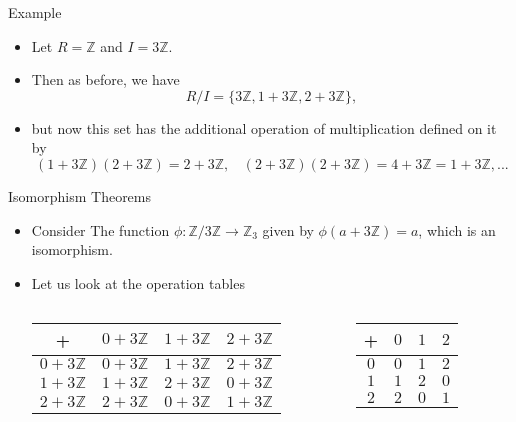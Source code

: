 \documentclass[ %
 10pt, xcolor={dvipsnames,svgnames,x11names,hyperref},
   hyperref={colorlinks=true,citecolor=green,linkcolor=DarkRed,urlcolor=ProcessBlue,anchorcolor=blue}
  ]{beamer}
\newenvironment{stepitemize}{\begin{itemize}[<+->]}{\end{itemize} }
\newcommand{\Z}{\mathbb{Z}}
\begin{document}
\begin{frame}{Example}
\begin{stepitemize}
    \item Let $R=\Z$ and $I=3\Z$. 
    \item Then as before, we have 
    $$R/I = \{3\Z, 1+3\Z, 2+3\Z\},$$
\item but now this set has the additional operation of multiplication defined on it by 
    $$(1+3\Z)(2+3\Z)=2+3\Z, \:\:\:\: (2+3\Z)(2+3\Z) = 4+3\Z=1+3\Z, ...$$
\end{stepitemize}
\end{frame}

\begin{frame}{Isomorphism Theorems}
\begin{stepitemize}
    \item Consider The function $\phi:\Z/3\Z\rightarrow \Z_3$ given by $\phi(a+3\Z)=a$, which is an isomorphism. 
    \item Let us look at the operation tables

\begin{columns}
        \begin{column}{0.4\textwidth}
     \begin{table}
\begin{tabular}{ c| c | c | c}
+ & {\color{blue}$0+3\Z$} & {\color{red} $1+3\Z$} & {\color{teal} $2+3\Z$} \\
\hline
{\color{blue} $0+3\Z$} & {\color{blue} $0+3\Z$} & {\color{red} $1+3\Z$} & {\color{teal} $2+3\Z$}  \\ 
\hline
{\color{red} $1+3\Z$} & {\color{red} $1+3\Z$} & {\color{teal} $2+3\Z$} & {\color{blue} $0+3\Z$}  \\ 
\hline
{\color{teal} $2+3\Z$} & {\color{teal} $2+3\Z$} & {\color{blue} $0+3\Z$} & {\color{red} $1+3\Z$} \\ 
\hline
\end{tabular}
\end{table}
    \end{column}
    
        \begin{column}{0.4\textwidth}
    \begin{table}
\begin{tabular}{ c| c | c | c}
+ & {\color{blue} $0$} & {\color{red} $1$} & {\color{teal} $2$} \\
\hline
{\color{blue} $0$} & {\color{blue} $0$} & {\color{red} $1$} & {\color{teal} $2$}  \\ 
\hline
{\color{red} $1$} & {\color{red} $1$} & {\color{teal}$2$} & {\color{blue} $0$}  \\ 
\hline
{\color{teal} $2$} & {\color{teal} $2$} & {\color{blue} $0$} & {\color{red} $1$} \\ 
\hline
\end{tabular}
\end{table}
    \end{column}
\end{columns}


\end{stepitemize}
\end{frame}
\end{document}
